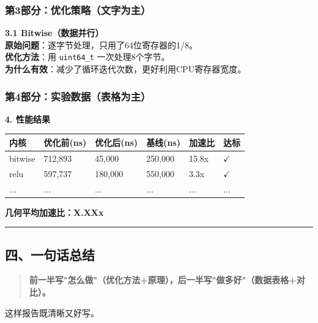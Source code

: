 \documentclass[11pt, a4paper]{article}
\begin{document}
\begin{aibox}
\subsubsection*{第3部分：优化策略（文字为主）}

\begin{tcolorbox}[colback=white,colframe=gray!50!white,boxrule=0.5pt,arc=2pt,left=5pt,right=5pt,top=5pt,bottom=5pt]
\textbf{3.1 Bitwise（数据并行）}\\[0.5em]
\textbf{原始问题}：逐字节处理，只用了64位寄存器的1/8。\\[0.5em]
\textbf{优化方法}：用 \texttt{uint64\_t} 一次处理8个字节。\\[0.5em]
\textbf{为什么有效}：减少了循环迭代次数，更好利用CPU寄存器宽度。
\end{tcolorbox}

\subsubsection*{第4部分：实验数据（表格为主）}

\begin{tcolorbox}[colback=white,colframe=gray!50!white,boxrule=0.5pt,arc=2pt,left=5pt,right=5pt,top=5pt,bottom=5pt]
\textbf{4. 性能结果}

\vspace{0.5em}
\begin{tabularx}{\textwidth}{@{} l l l l l X @{}}
\toprule
内核 & 优化前(ns) & 优化后(ns) & 基线(ns) & 加速比 & 达标 \\
\midrule
bitwise & 712,893 & 45,000 & 250,000 & 15.8x & $\checkmark$ \\
relu & 597,737 & 180,000 & 550,000 & 3.3x & $\checkmark$ \\
... & ... & ... & ... & ... & ... \\
\bottomrule
\end{tabularx}
\vspace{0.5em}

\textbf{几何平均加速比：X.XXx}
\end{tcolorbox}

\begin{center}\rule{\textwidth}{0.4pt}\end{center}

\subsection*{四、一句话总结}

\begin{quote}
\textbf{前一半写"怎么做"（优化方法+原理），后一半写"做多好"（数据表格+对比）。}
\end{quote}

这样报告既清晰又好写。
\end{aibox}
\end{document}
